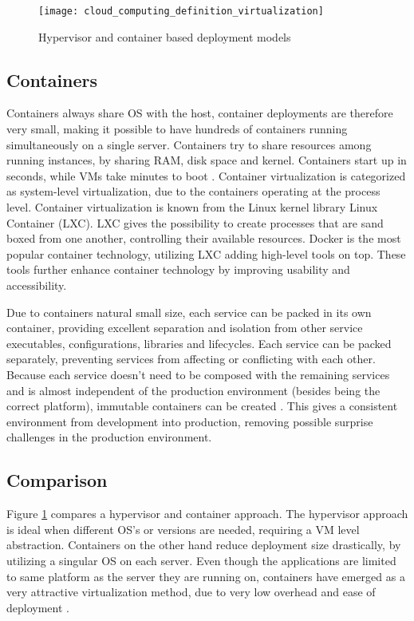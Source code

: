 \begin{figure}[!htb]
	\centering 
		 \texttt{[image: cloud\_computing\_definition\_virtualization]}  
	  \caption{Hypervisor and container based deployment models \cite{bernstein2014containers}}
  \label{fig:cloud_computing_definition_virtualization}
\end{figure}

\subsection{Containers}
Containers always share OS with the host, container deployments are therefore very small, making it possible to have hundreds of containers running simultaneously on a single server. Containers try to share resources among running instances, by sharing RAM, disk space and kernel. Containers start up in seconds, while VMs take minutes to boot \cite{dockerFAQ}. Container virtualization is categorized as system-level virtualization, due to the containers operating at the process level. Container virtualization is known from the Linux kernel library Linux Container (LXC). LXC gives the possibility to create processes that are sand boxed from one another, controlling their available resources. Docker is the most popular container technology, utilizing LXC adding high-level tools on top. These tools further enhance container technology by improving usability and accessibility.

Due to containers natural small size, each service can be packed in its own container, providing excellent separation and isolation from other service executables, configurations, libraries and lifecycles. Each service can be packed separately, preventing services from affecting or conflicting with each other. Because each service doesn't need to be composed with the remaining services and is almost independent of the production environment (besides being the correct platform), immutable containers can be created \cite{kubernetes_what_is}. This gives a consistent environment from development into production, removing possible surprise challenges in the production environment.

\subsection{Comparison}
Figure \ref{fig:cloud_computing_definition_virtualization} compares a hypervisor and container approach. The hypervisor approach is ideal when different OS's or versions are needed, requiring a VM level abstraction\cite{bernstein2014containers}. Containers on the other hand reduce deployment size drastically, by utilizing a singular OS on each server. Even though the applications are limited to same platform as the server they are running on, containers have emerged as a very attractive virtualization method, due to very low overhead and ease of deployment \cite{fink2014docker}.


